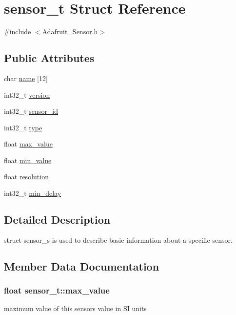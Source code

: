 \hypertarget{structsensor__t}{}\section{sensor\+\_\+t Struct Reference}
\label{structsensor__t}


{\ttfamily \#include $<$Adafruit\+\_\+\+Sensor.\+h$>$}

\subsection*{Public Attributes}
\begin{DoxyCompactItemize}
\item 
char \hyperlink{structsensor__t_a4383b68d36f9dc4096d83583c3b009bf}{name} \mbox{[}12\mbox{]}
\item 
int32\+\_\+t \hyperlink{structsensor__t_a274f12a47669fbd2b61935706339e1c2}{version}
\item 
int32\+\_\+t \hyperlink{structsensor__t_a224f6201d59873cc1b6e9dd8a1894736}{sensor\+\_\+id}
\item 
int32\+\_\+t \hyperlink{structsensor__t_ae1d59df64438923d3bd95f2416c32203}{type}
\item 
float \hyperlink{structsensor__t_a1a17359f1080eb169a452656f7dec1ee}{max\+\_\+value}
\item 
float \hyperlink{structsensor__t_a4556ed82a0389a7f6af25a6fd0ee1431}{min\+\_\+value}
\item 
float \hyperlink{structsensor__t_a926aba3216afd50e62c0a6cdbcc7433a}{resolution}
\item 
int32\+\_\+t \hyperlink{structsensor__t_a1cd271377ff25ec9ca54886f876c87ec}{min\+\_\+delay}
\end{DoxyCompactItemize}


\subsection{Detailed Description}
struct sensor\+\_\+s is used to describe basic information about a specific sensor. 

\subsection{Member Data Documentation}
\subsubsection[{\texorpdfstring{max\+\_\+value}{max_value}}]{\setlength{\rightskip}{0pt plus 5cm}float sensor\+\_\+t\+::max\+\_\+value}\hypertarget{structsensor__t_a1a17359f1080eb169a452656f7dec1ee}{}\label{structsensor__t_a1a17359f1080eb169a452656f7dec1ee}
maximum value of this sensor\textquotesingle{}s value in SI units 
